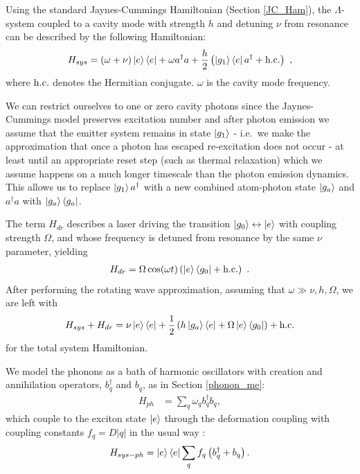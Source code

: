 Using the standard Jaynes-Cummings Hamiltonian (Section \ref{JC_Ham}), the $\Lambda$-system coupled to a cavity mode with strength $h$ and detuning $\nu$ from resonance  can be described by the following Hamiltonian:
\begin{eqnarray}
  H_{sys} = \left(\omega + \nu\right)\left\vert e \right\rangle \left\langle e \right\vert + \omega a^\dagger a + \frac{h}{2}\left(\left\vert g_1 \right\rangle \left\langle e \right\vert a^\dagger + \textrm{h.c.} \right)~,
\end{eqnarray}
where $\textrm{h.c.}$ denotes the Hermitian conjugate. $\omega$ is the cavity mode frequency.

We can restrict ourselves to one or zero cavity photons since the Jaynes-Cummings model preserves excitation number and after photon emission we assume that the emitter system remains in state $\left\vert g_1\right\rangle$ - i.e.\ we make the approximation that once a photon has escaped re-excitation does not occur - at least until an appropriate reset step (such as thermal relaxation) which we assume happens on a much longer timescale than the photon emission dynamics. This allows us to replace $\left\vert g_1\right\rangle a^\dagger$ with a new combined atom-photon state $\left\vert g_a\right\rangle$ and $a^\dagger a$ with $\left\vert g_a \right\rangle \left\langle g_a \right\vert$. 

The term $H_{dr}$ describes a laser driving the transition $\left\vert g_0\right\rangle \leftrightarrow \left\vert e\right\rangle$ with coupling strength $\Omega$, and whose frequency is detuned from resonance by the same $\nu$ parameter, yielding
\begin{eqnarray}
  H_{dr} = \Omega \cos(\omega t) \left(\left\vert e \right\rangle \left\langle g_0 \right\vert + \textrm{h.c.} \right)~.
\end{eqnarray}
After performing the rotating wave approximation, assuming that $\omega \gg \nu, h, \Omega$, we are left with 
\begin{eqnarray}
  H_{sys} + H_{dr} =  \nu\left\vert e \right\rangle \left\langle e \right\vert + \frac{1}{2}\left(h \left\vert g_a \right\rangle \left\langle e \right\vert + \Omega \left\vert e \right\rangle \left\langle g_0 \right\vert\right) + \textrm{h.c.}
\end{eqnarray}
for the total system Hamiltonian.

We model the phonons as a bath of harmonic oscillators with creation and annihilation operators, $b_q^\dagger$ and $b_q$, as in Section \ref{phonon_me}:
\begin{eqnarray}
  H_{ph} &= \sum_q \omega_q b_q^\dagger b_q,
\end{eqnarray}
which couple to the exciton state $\left\vert e\right\rangle$ through the deformation coupling with coupling  constants $f_q = D|q|$ in the usual way \cite{mahan00}: 
\begin{eqnarray}
  H_{sys-ph} = \left\vert e \right\rangle \left\langle e \right\vert\sum_q f_q \left(b_q^\dagger + b_q\right).
\end{eqnarray}

